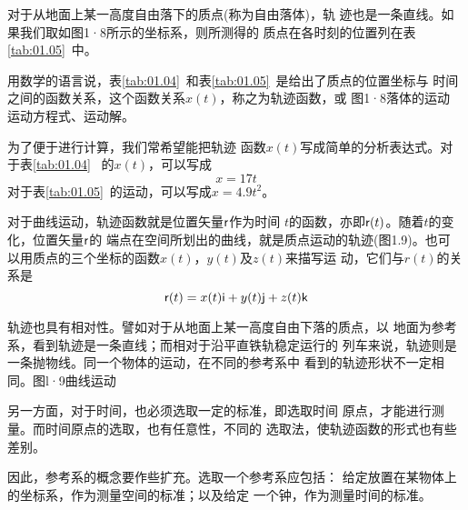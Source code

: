     对于从地面上某一高度自由落下的质点(称为自由落体)，轨
迹也是一条直线。如果我们取如图1·8所示的坐标系，则所测得的
质点在各时刻的位置列在表\ref{tab:01.05}~中。
\begin{table}[!h]
    \vspace{-0.5em}
    \caption{}
    \label{tab:01.05}
    \centering
    \vspace{-1.2em}
\end{table}

    用数学的语言说，表\ref{tab:01.04}~和表\ref{tab:01.05}~是给出了质点的位置坐标与
时间之间的函数关系，这个函数关系$x(t)$，称之为轨迹函数，或
图1·8落体的运动
运动方程式、运动解。

    为了便于进行计算，我们常希望能把轨迹
函数$x(t)$写成简单的分析表达式。对于表\ref{tab:01.04}~
的$x(t)$，可以写成
\begin{equation}\label{equ:01.05.01}
        x=17t
\end{equation}
对于表\ref{tab:01.05}~的运动，可以写成$x=4.9t^2$。

    对于曲线运动，轨迹函数就是位置矢量${\sf r}$作为时间
$t$的函数，亦即${\sf r}(t)$。随着$t$的变化，位置矢量${\sf r}$的
端点在空间所划出的曲线，就是质点运动的轨迹(图1.9)。也可
以用质点的三个坐标的函数$x(t)$，$y(t)$及$z(t)$来描写运
动，它们与$r(t)$的关系是
\begin{equation}\label{equ:01.05.02}
        {\sf r}(t)=x(t){\sf i}+y(t){\sf j}+z(t){\sf k}
\end{equation}

    轨迹也具有相对性。譬如对于从地面上某一高度自由下落的质点，以
地面为参考系，看到轨迹是一条直线；而相对于沿平直铁轨稳定运行的
列车来说，轨迹则是一条抛物线。同一个物体的运动，在不同的参考系中
看到的轨迹形状不一定相同。图l·9曲线运动

    另一方面，对于时间，也必须选取一定的标准，即选取时间
原点，才能进行测量。而时间原点的选取，也有任意性，不同的
选取法，使轨迹函数的形式也有些差别。

    因此，参考系的概念要作些扩充。选取一个参考系应包括：
给定放置在某物体上的坐标系，作为测量空间的标准；以及给定
一个钟，作为测量时间的标准。